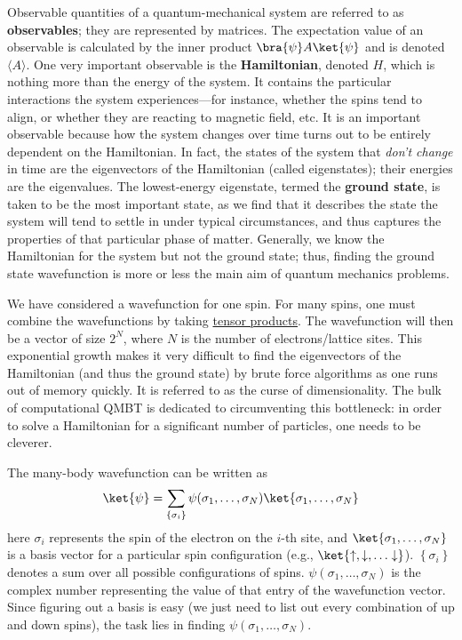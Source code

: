 \documentclass{article}
\begin{document}
Observable quantities of a quantum-mechanical system are referred to as 
\textbf{observables}; they are represented by matrices. The expectation value 
of an observable is calculated by the inner product $ \bra{\psi}A\ket{\psi} $
and is denoted $ \langle A \rangle $. One very important observable is the 
\textbf{Hamiltonian}, denoted $ H $, which is nothing more than the energy of the system. 
It contains the particular interactions the system experiences---for instance, 
whether the spins tend to align, or whether they are reacting to magnetic field, etc.
It is an important observable because how the system changes over time turns 
out to be entirely dependent on the Hamiltonian. In fact, the states of the 
system that \textit{don't change} in time are the eigenvectors of the Hamiltonian 
(called eigenstates); their energies are the eigenvalues. The lowest-energy
eigenstate, termed the \textbf{ground state}, is taken to be the most important 
state, as we find that it describes the state the system will tend to settle 
in under typical circumstances, and thus captures the properties of that particular 
phase of matter. Generally, we know the Hamiltonian for the system but not the 
ground state; thus, finding the ground state wavefunction is more or less the 
main aim of quantum mechanics problems.

We have considered a wavefunction for one spin. For many spins, one must 
combine the wavefunctions by taking \href{https://en.wikipedia.org/wiki/Kronecker_product}{tensor products}.
The wavefunction will then be a vector of size $ 2^{N} $, where $ N $ is the 
number of electrons/lattice sites. 
This exponential growth makes it very difficult 
to find the eigenvectors of the Hamiltonian (and thus the ground state) by 
brute force algorithms as one runs out of memory quickly. It is referred to as
the curse of dimensionality. The bulk of computational QMBT is dedicated to
circumventing this bottleneck:
in order to solve a Hamiltonian for a significant number of particles, one
needs to be cleverer.

The many-body wavefunction can be written as 
\begin{equation*}
	\ket{\psi} = \sum_{\left\{\sigma_{i}\right\}} \psi(\sigma_1, \dots, \sigma_N)
	\ket{\sigma_1, \dots, \sigma_N}
\end{equation*}
here $ \sigma_i $ represents the spin of the electron on the $ i $-th site, 
and $ \ket{\sigma_1 ,\dots, \sigma_N} $ is a basis vector for a particular 
spin configuration (e.g., $ \ket{\uparrow, \downarrow, \dots\downarrow } $).
$ \left\{\sigma_i\right\} $ denotes a sum over all possible configurations of 
spins.  $ \psi(\sigma_1,\dots,\sigma_N) $ is the complex number representing the
value of that entry of the wavefunction vector. Since figuring out a basis is 
easy (we just need to list out every combination of up and down spins), 
the task lies in finding $ \psi(\sigma_1, \dots,\sigma_N) $.
\end{document}

